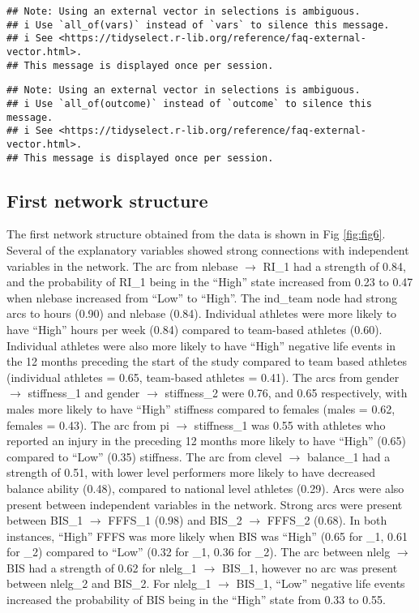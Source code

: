\documentclass[
]{frontiersHLTH}
\begin{document}
\begin{verbatim}
## Note: Using an external vector in selections is ambiguous.
## i Use `all_of(vars)` instead of `vars` to silence this message.
## i See <https://tidyselect.r-lib.org/reference/faq-external-vector.html>.
## This message is displayed once per session.
\end{verbatim}

\begin{verbatim}
## Note: Using an external vector in selections is ambiguous.
## i Use `all_of(outcome)` instead of `outcome` to silence this message.
## i See <https://tidyselect.r-lib.org/reference/faq-external-vector.html>.
## This message is displayed once per session.
\end{verbatim}

\hypertarget{first-network-structure}{%
\subsection{First network structure}\label{first-network-structure}}

The first network structure obtained from the data is shown in Fig
\ref{fig:fig6}. Several of the explanatory variables showed strong
connections with independent variables in the network. The arc from
nlebase \(\rightarrow\) RI\_1 had a strength of 0.84, and the
probability of RI\_1 being in the ``High'' state increased from 0.23 to
0.47 when nlebase increased from ``Low'' to ``High''. The ind\_team node
had strong arcs to hours (0.90) and nlebase (0.84). Individual athletes
were more likely to have ``High'' hours per week (0.84) compared to
team-based athletes (0.60). Individual athletes were also more likely to
have ``High'' negative life events in the 12 months preceding the start
of the study compared to team based athletes (individual athletes =
0.65, team-based athletes = 0.41). The arcs from gender \(\rightarrow\)
stiffness\_1 and gender \(\rightarrow\) stiffness\_2 were 0.76, and 0.65
respectively, with males more likely to have ``High'' stiffness compared
to females (males = 0.62, females = 0.43). The arc from pi
\(\rightarrow\) stiffness\_1 was 0.55 with athletes who reported an
injury in the preceding 12 months more likely to have ``High'' (0.65)
compared to ``Low'' (0.35) stiffness. The arc from clevel
\(\rightarrow\) balance\_1 had a strength of 0.51, with lower level
performers more likely to have decreased balance ability (0.48),
compared to national level athletes (0.29). Arcs were also present
between independent variables in the network. Strong arcs were present
between BIS\_1 \(\rightarrow\) FFFS\_1 (0.98) and BIS\_2 \(\rightarrow\)
FFFS\_2 (0.68). In both instances, ``High'' FFFS was more likely when
BIS was ``High'' (0.65 for \_1, 0.61 for \_2) compared to ``Low'' (0.32
for \_1, 0.36 for \_2). The arc between nlelg \(\rightarrow\) BIS had a
strength of 0.62 for nlelg\_1 \(\rightarrow\) BIS\_1, however no arc was
present between nlelg\_2 and BIS\_2. For nlelg\_1 \(\rightarrow\)
BIS\_1, ``Low'' negative life events increased the probability of BIS
being in the ``High'' state from 0.33 to 0.55.
\end{document}
